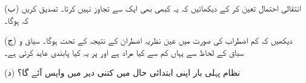 (ب) انتقالی احتمال  تعین کر کے دیکھائیں کہ یہ کبھی بھی ایک سے تجاوز نہیں کرتا۔ تصدیق کریں کہ  ہوگا۔

(ج) دیکھیں کہ کم اضطراب کی صورت میں  عین نظریہ اضطران کے نتیجہ  کے تحت ہوگا۔ سیاق و سباق کے لحاظ سے یہاں کم سے کیا مراد ہے اور  پر یہ کیا پابندی عاید کرتی ہے۔

(د) نظام پہلی بار اپنی ابتدائی حال میں کتنی دیر میں واپس آئے گا؟
